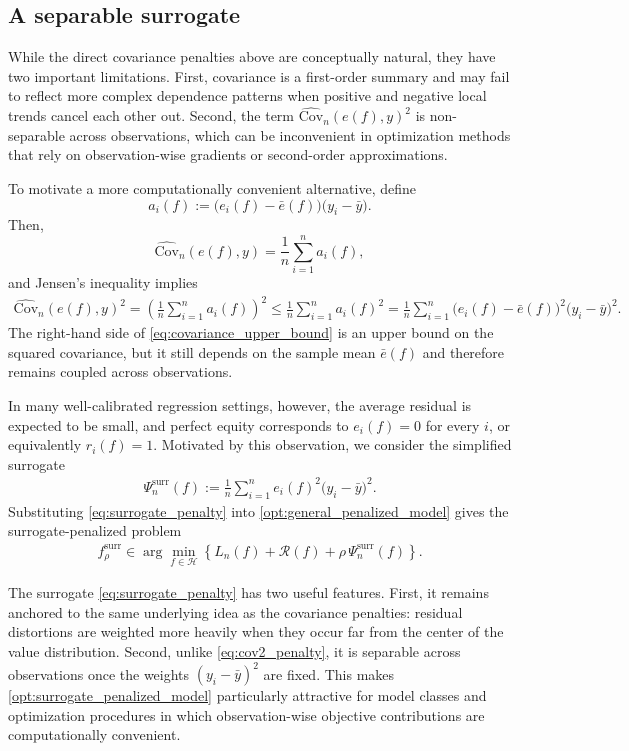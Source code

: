\documentclass[12pt, draft]{article}
\theoremstyle{plain}
\theoremstyle{definition}
\newcommand{\1}{\mathbf{1}}
\newcommand{\Cov}{\text{Cov}}
\renewcommand{\H}{\mathcal{H}}
\begin{document}
\subsection{A separable surrogate}

While the direct covariance penalties above are conceptually natural, they have two important limitations. First, covariance is a first-order summary and may fail to reflect more complex dependence patterns when positive and negative local trends cancel each other out. Second, the term $\widehat{\Cov}_n(e(f),y)^2$ is non-separable across observations, which can be inconvenient in optimization methods that rely on observation-wise gradients or second-order approximations.

To motivate a more computationally convenient alternative, define
\[
a_i(f):=\bigl(e_i(f)-\bar e(f)\bigr)\bigl(y_i-\bar y\bigr).
\]
Then,
\[
\widehat{\Cov}_n(e(f),y)
=
\frac{1}{n}\sum_{i=1}^n a_i(f),
\]
and Jensen's inequality implies
\begin{align}
    \label{eq:covariance_upper_bound}
    \widehat{\Cov}_n(e(f),y)^2
    =
    \left(
        \frac{1}{n}\sum_{i=1}^n a_i(f)
    \right)^2
    \le
    \frac{1}{n}\sum_{i=1}^n a_i(f)^2
    =
    \frac{1}{n}\sum_{i=1}^n
    \bigl(e_i(f)-\bar e(f)\bigr)^2
    \bigl(y_i-\bar y\bigr)^2.
\end{align}
The right-hand side of \eqref{eq:covariance_upper_bound} is an upper bound on the squared covariance, but it still depends on the sample mean $\bar e(f)$ and therefore remains coupled across observations.

In many well-calibrated regression settings, however, the average residual is expected to be small, and perfect equity corresponds to $e_i(f)=0$ for every $i$, or equivalently $r_i(f)=1$. Motivated by this observation, we consider the simplified surrogate
\begin{align}
    \label{eq:surrogate_penalty}
    \Psi_n^{\mathrm{surr}}(f)
    :=
    \frac{1}{n}\sum_{i=1}^n
    e_i(f)^2\bigl(y_i-\bar y\bigr)^2.
\end{align}
Substituting \eqref{eq:surrogate_penalty} into \eqref{opt:general_penalized_model} gives the surrogate-penalized problem
\begin{align}
    \label{opt:surrogate_penalized_model}
    f_{\rho}^{\mathrm{surr}}
    \in
    \arg\min_{f\in\H}
    \left\{
        L_n(f)+\mathcal{R}(f)
        +
        \rho\,\Psi_n^{\mathrm{surr}}(f)
    \right\}.
\end{align}

The surrogate \eqref{eq:surrogate_penalty} has two useful features. First, it remains anchored to the same underlying idea as the covariance penalties: residual distortions are weighted more heavily when they occur far from the center of the value distribution. Second, unlike \eqref{eq:cov2_penalty}, it is separable across observations once the weights $(y_i-\bar y)^2$ are fixed. This makes \eqref{opt:surrogate_penalized_model} particularly attractive for model classes and optimization procedures in which observation-wise objective contributions are computationally convenient.
\end{document}
